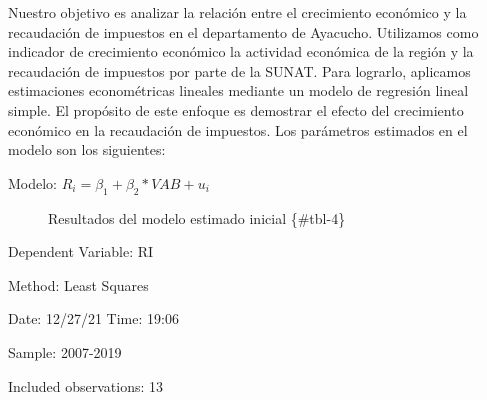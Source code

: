 \documentclass[
  letterpaper,
]{article}
\begin{document}
Nuestro objetivo es analizar la relación entre el crecimiento económico
y la recaudación de impuestos en el departamento de Ayacucho. Utilizamos
como indicador de crecimiento económico la actividad económica de la
región y la recaudación de impuestos por parte de la SUNAT. Para
lograrlo, aplicamos estimaciones econométricas lineales mediante un
modelo de regresión lineal simple. El propósito de este enfoque es
demostrar el efecto del crecimiento económico en la recaudación de
impuestos. Los parámetros estimados en el modelo son los siguientes:

\begin{description}
\item[Modelo: \(R_i = β_1 + β_{2}*VAB + u_i\)]
Resultados del modelo estimado inicial \{\#tbl-4\}
\end{description}

Dependent Variable: RI

Method: Least Squares

Date: 12/27/21 Time: 19:06

Sample: 2007-2019

Included observations: 13
\end{document}

